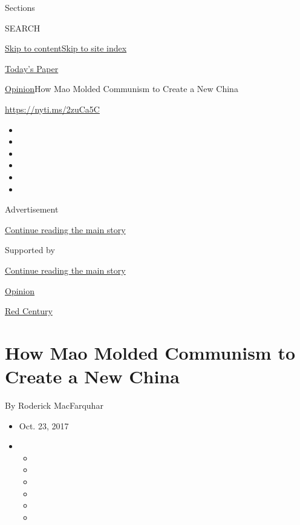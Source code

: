 Sections

SEARCH

\protect\hyperlink{site-content}{Skip to
content}\protect\hyperlink{site-index}{Skip to site index}

\href{https://myaccount.nytimes.com/auth/login?response_type=cookie\&client_id=vi}{}

\href{https://www.nytimes.com/section/todayspaper}{Today's Paper}

\href{/section/opinion}{Opinion}\textbar{}How Mao Molded Communism to
Create a New China

\href{https://nyti.ms/2zuCa5C}{https://nyti.ms/2zuCa5C}

\begin{itemize}
\item
\item
\item
\item
\item
\item
\end{itemize}

Advertisement

\protect\hyperlink{after-top}{Continue reading the main story}

Supported by

\protect\hyperlink{after-sponsor}{Continue reading the main story}

\href{/section/opinion}{Opinion}

\href{/column/red-century}{Red Century}

\hypertarget{how-mao-molded-communism-to-create-a-new-china}{%
\section{How Mao Molded Communism to Create a New
China}\label{how-mao-molded-communism-to-create-a-new-china}}

By Roderick MacFarquhar

\begin{itemize}
\item
  Oct. 23, 2017
\item
  \begin{itemize}
  \item
  \item
  \item
  \item
  \item
  \item
  \end{itemize}
\end{itemize}

